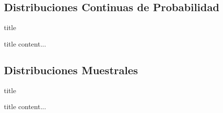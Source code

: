 \documentclass[11pt]{beamer}
\begin{document}
    \subsection*{Distribuciones Continuas de Probabilidad}
    \begin{frame}{title}
        \begin{block}{title}
            content...
        \end{block}
    \end{frame}



    \subsection*{Distribuciones Muestrales}
    \begin{frame}{title}
        \begin{block}{title}
            content...
        \end{block}
    \end{frame}
\end{document}
